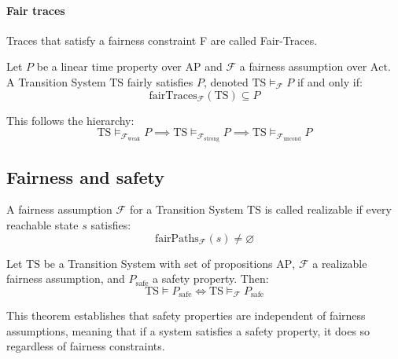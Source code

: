 \paragraph*{Fair traces}
Traces that satisfy a fairness constraint F are called Fair-Traces.
\begin{definition}
    Let $P$ be a linear time property over $\text{AP}$ and $\mathcal{F}$ a fairness assumption over $\text{Act}$. 
    A Transition System $\text{TS}$ fairly satisfies $P$, denoted $\text{TS} \models_{\mathcal{F}} P$ if and only if: 
    \[\text{fairTraces}_{\mathcal{F}}(\text{TS})\subseteq P\]

\end{definition}
\noindent This follows the hierarchy: 
\[\text{TS} \models_{\mathcal{F}_{\text{weak}}} P \implies \text{TS} \models_{\mathcal{F}_{\text{strong}}} P \implies \text{TS} \models_{\mathcal{F}_{\text{uncond}}} P\]

\subsection{Fairness and safety}
\begin{definition}
    A fairness assumption $\mathcal{F}$ for a Transition System $\text{TS}$ is called realizable if every reachable state $s$  satisfies:
    \[\text{fairPaths}_\mathcal{F} (s) \neq \varnothing\]
\end{definition}
\begin{theorem}
    Let $\text{TS}$ be a Transition System with set of propositions $\text{AP}$, $\mathcal{F}$ a realizable fairness assumption, and $P_{\text{safe}}$ a safety property. 
    Then:
    \[\text{TS}\models P_{\text{safe}} \Leftrightarrow \text{TS}\models_{\mathcal{F}} P_{\text{safe}}\]
\end{theorem}
\noindent This theorem establishes that safety properties are independent of fairness assumptions, meaning that if a system satisfies a safety property, it does so regardless of fairness constraints.